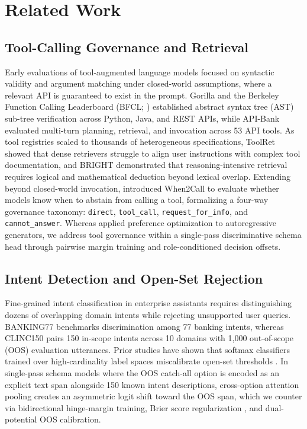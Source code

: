 \documentclass[10pt,twocolumn]{article}
\begin{document}
\section{Related Work}

\subsection{Tool-Calling Governance and Retrieval}
Early evaluations of tool-augmented language models focused on syntactic validity and argument matching under closed-world assumptions, where a relevant API is guaranteed to exist in the prompt. Gorilla and the Berkeley Function Calling Leaderboard (BFCL; \citealp{patil2024gorilla}) established abstract syntax tree (AST) sub-tree verification across Python, Java, and REST APIs, while API-Bank \citep{li2023apibank} evaluated multi-turn planning, retrieval, and invocation across 53 API tools. As tool registries scaled to thousands of heterogeneous specifications, ToolRet \citep{shi2025toolret} showed that dense retrievers struggle to align user instructions with complex tool documentation, and BRIGHT \citep{su2025bright} demonstrated that reasoning-intensive retrieval requires logical and mathematical deduction beyond lexical overlap. Extending beyond closed-world invocation, \citet{ross2025when2call} introduced When2Call to evaluate whether models know when to abstain from calling a tool, formalizing a four-way governance taxonomy: \texttt{direct}, \texttt{tool\_call}, \texttt{request\_for\_info}, and \texttt{cannot\_answer}. Whereas \citet{ross2025when2call} applied preference optimization to autoregressive generators, we address tool governance within a single-pass discriminative schema head through pairwise margin training and role-conditioned decision offsets.

\subsection{Intent Detection and Open-Set Rejection}
Fine-grained intent classification in enterprise assistants requires distinguishing dozens of overlapping domain intents while rejecting unsupported user queries. BANKING77 \citep{casanueva2020banking77} benchmarks discrimination among 77 banking intents, whereas CLINC150 \citep{larson2019clinc150} pairs 150 in-scope intents across 10 domains with 1,000 out-of-scope (OOS) evaluation utterances. Prior studies have shown that softmax classifiers trained over high-cardinality label spaces miscalibrate open-set thresholds \citep{guo2017calibration,larson2019clinc150}. In single-pass schema models where the OOS catch-all option is encoded as an explicit text span alongside 150 known intent descriptions, cross-option attention pooling creates an asymmetric logit shift toward the OOS span, which we counter via bidirectional hinge-margin training, Brier score regularization \citep{brier1950verification}, and dual-potential OOS calibration.
\end{document}

